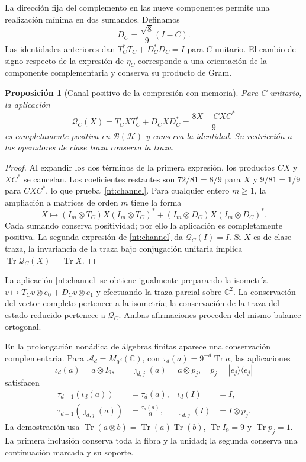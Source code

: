 \documentclass[a4paper,10pt]{article}
\newtheorem{proposition}[theorem]{Proposición}
\theoremstyle{definition}\newtheorem{definition}[theorem]{Definición}
\theoremstyle{remark}\newtheorem{remark}[theorem]{Observación}
\numberwithin{equation}{section}
\begin{document}
La dirección fija del complemento en las nueve componentes
permite una realización mínima en dos sumandos. Definamos
\[
 D_C=\frac{\sqrt8}{9}(I-C).
\]
Las identidades anteriores dan
\(T_C^*T_C+D_C^*D_C=I\) para \(C\) unitario.
El cambio de signo respecto de la expresión de
\(\eta_C\) corresponde a una orientación de la componente
complementaria y conserva su producto de Gram.

\begin{proposition}[Canal positivo de la compresión con memoria]
Para \(C\) unitario, la aplicación
\begin{equation}
 \mathcal Q_C(X)=T_CXT_C^*+D_CXD_C^*
              =\frac{8X+CXC^*}{9}
 \label{nt:channel}
\end{equation}
es completamente positiva en \(\mathcal B(\mathcal H)\) y
conserva la identidad. Su restricción a los operadores de
clase traza conserva la traza.
\end{proposition}

\begin{proof}
Al expandir los dos términos de la primera expresión,
los productos \(CX\) y \(XC^*\) se cancelan. Los coeficientes
restantes son \(72/81=8/9\) para \(X\) y \(9/81=1/9\)
para \(CXC^*\), lo que prueba~\eqref{nt:channel}.
Para cualquier entero \(m\geq1\), la ampliación a matrices
de orden \(m\) tiene la forma
\[
 X\longmapsto
 (I_m\otimes T_C)X(I_m\otimes T_C)^*
 +(I_m\otimes D_C)X(I_m\otimes D_C)^*.
\]
Cada sumando conserva positividad; por ello la aplicación es
completamente positiva. La segunda expresión de
\eqref{nt:channel} da \(\mathcal Q_C(I)=I\).
Si \(X\) es de clase traza, la invariancia de la traza bajo
conjugación unitaria implica
\(\operatorname{Tr}\mathcal Q_C(X)=\operatorname{Tr}X\).
\end{proof}

La aplicación \eqref{nt:channel} se obtiene igualmente
preparando la isometría
\(v\mapsto T_Cv\otimes e_0+D_Cv\otimes e_1\) y efectuando
la traza parcial sobre \(\mathbb C^2\).
La conservación del vector completo pertenece a la isometría;
la conservación de la traza del estado reducido pertenece a
\(\mathcal Q_C\). Ambas afirmaciones proceden del mismo
balance ortogonal.

En la prolongación nonádica de álgebras finitas aparece una
conservación complementaria. Para
\(\mathcal A_d=M_{9^d}(\mathbb C)\), con
\(\tau_d(a)=9^{-d}\operatorname{Tr}a\), las aplicaciones
\[
 \iota_d(a)=a\otimes I_9,\qquad
 \jmath_{d,j}(a)=a\otimes p_j,
 \quad p_j=|e_j\rangle\langle e_j|
\]
satisfacen
\begin{align}
 \tau_{d+1}(\iota_d(a))&=\tau_d(a),
 &\iota_d(I)&=I,\label{nt:unital-trace}\\
 \tau_{d+1}(\jmath_{d,j}(a))&=\frac{\tau_d(a)}9,
 &\jmath_{d,j}(I)&=I\otimes p_j.\label{nt:corner-trace}
\end{align}
La demostración usa
\(\operatorname{Tr}(a\otimes b)=
\operatorname{Tr}(a)\operatorname{Tr}(b)\),
\(\operatorname{Tr}I_9=9\) y \(\operatorname{Tr}p_j=1\).
La primera inclusión conserva toda la fibra y la unidad;
la segunda conserva una continuación marcada y su soporte.
\end{document}
